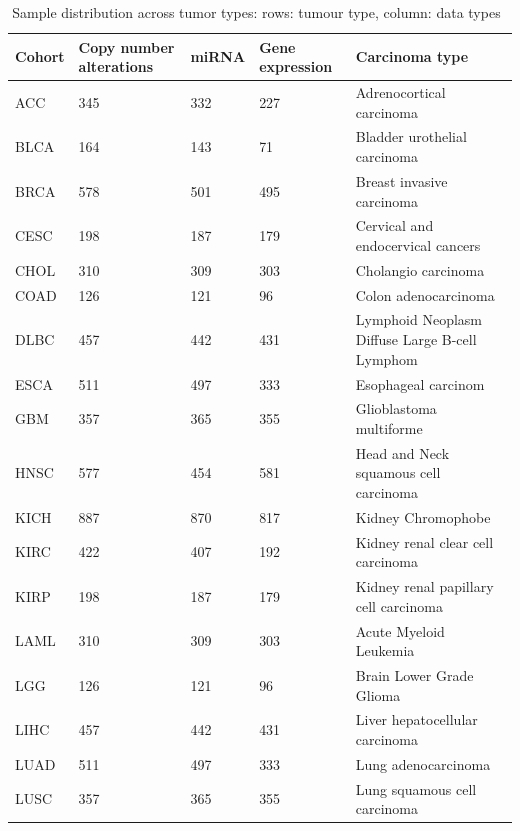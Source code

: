 \begin{table} [h]
\centering
    \scriptsize
    \caption{Sample distribution across tumor types: rows: tumour type, column: data types~\cite{weinstein2013cancer}}
    \label{table:alldatadetails2}
    \vspace{-2mm}
    \begin{tabular}{l|l|l|l|l}
        \hline
        \rowcolor{Gray}
         \textbf{Cohort} & \textbf{Copy number alterations} & \textbf{miRNA} & \textbf{Gene expression} & \textbf{Carcinoma type} \\\hline
            ACC & 345 & 332 & 227 & Adrenocortical carcinoma \\\hline
            BLCA & 164 & 143 & 71 & Bladder urothelial carcinoma \\\hline%
            BRCA  & 578 & 501 & 495 & Breast invasive carcinoma \\\hline
            CESC & 198 & 187 & 179 & Cervical and endocervical cancers	\\\hline%
            CHOL & 310 & 309 & 303 & Cholangio carcinoma \\\hline 
            COAD & 126 & 121 & 96 & Colon adenocarcinoma \\\hline 
            DLBC & 457 & 442 & 431 & Lymphoid Neoplasm Diffuse Large B-cell Lymphom  \\\hline
            ESCA & 511 & 497 & 333 & Esophageal carcinom \\\hline
            GBM & 357 & 365 & 355 & Glioblastoma multiforme \\\hline
            HNSC   & 577 & 454 & 581 & Head and Neck squamous cell carcinoma \\\hline
            KICH & 887 & 870 & 817 & Kidney Chromophobe  \\\hline
            KIRC & 422 & 407 & 192 & Kidney renal clear cell carcinoma \\\hline
            KIRP & 198 & 187 & 179 & Kidney renal papillary cell carcinoma	\\\hline%
            LAML & 310 & 309 & 303 & Acute Myeloid Leukemia \\\hline 
            LGG & 126 & 121 & 96 & Brain Lower Grade Glioma \\\hline 
            LIHC & 457 & 442 & 431 & Liver hepatocellular carcinoma  \\\hline
            LUAD & 511 & 497 & 333 & Lung adenocarcinoma \\\hline
            LUSC & 357 & 365 & 355 & Lung squamous cell carcinoma \\\hline

\end{tabular}
\end{table}
